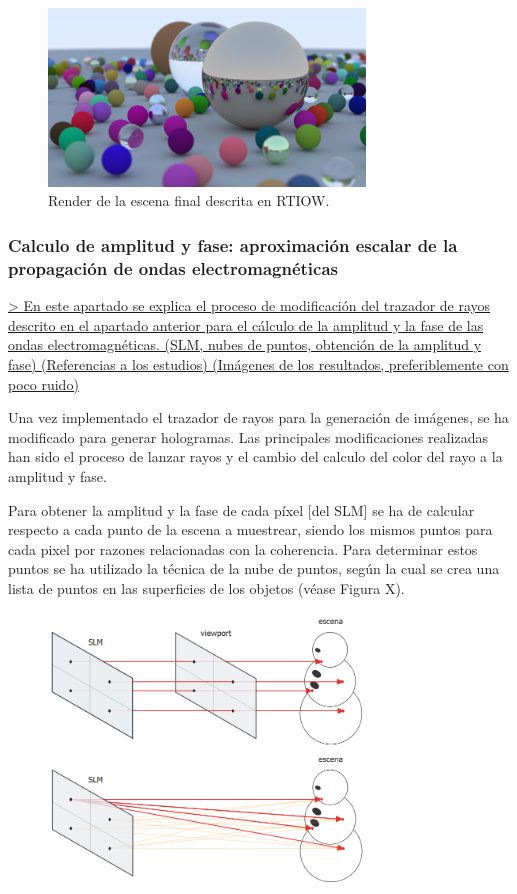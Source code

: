 \documentclass[10pt, a4paper]{article}
\begin{document}
\begin{figure}[h]
     \centering 
    \includegraphics[width=0.75\textwidth]{06_end_book_1}
            
    \caption{Render de la escena final descrita en RTIOW.}
\end{figure}

\subsubsection{Calculo de amplitud y fase: aproximación escalar de la propagación de ondas electromagnéticas}

\underline{> En este apartado se explica el proceso de modificación del trazador de rayos descrito en el apartado anterior para el cálculo de la amplitud y la fase de las ondas electromagnéticas. (SLM, nubes de puntos, obtención de la amplitud y fase) (Referencias a los estudios) (Imágenes de los resultados, preferiblemente con poco ruido)}

Una vez implementado el trazador de rayos para la generación de imágenes, se ha modificado para generar hologramas. Las principales modificaciones realizadas han sido el proceso de lanzar rayos y el cambio del calculo del color del rayo a la amplitud y fase.

Para obtener la amplitud y la fase de cada píxel [del SLM] se ha de calcular respecto a cada punto de la escena a muestrear, siendo los mismos puntos para cada pixel por razones relacionadas con la coherencia. Para determinar estos puntos se ha utilizado la técnica de la nube de puntos, según la cual se crea una lista de puntos en las superficies de los objetos (véase Figura X). 

\begin{figure}[h]
     \centering 
    \includegraphics[width=0.75\textwidth]{slm}

\end{figure}
\end{document}
